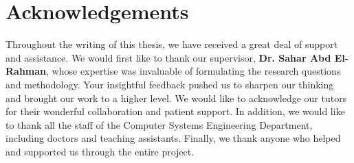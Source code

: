 \section*{\centering\huge Acknowledgements}
	\vspace{1cm}
	
	\large
	Throughout the writing of this thesis, we have received a great deal of support and assistance. 
	We would first like to thank our supervisor, \textbf{Dr. Sahar Abd El-Rahman}, whose expertise was invaluable of formulating the research questions and methodology. Your insightful feedback pushed us to sharpen our thinking and brought our work to a higher level. 
	We would like to acknowledge our tutors for their wonderful collaboration and patient support. 
	In addition, we would like to thank all the staff of the Computer Systems Engineering Department, including doctors and teaching assistants. 
	Finally, we thank anyone who helped and supported us through the entire project.

\newpage